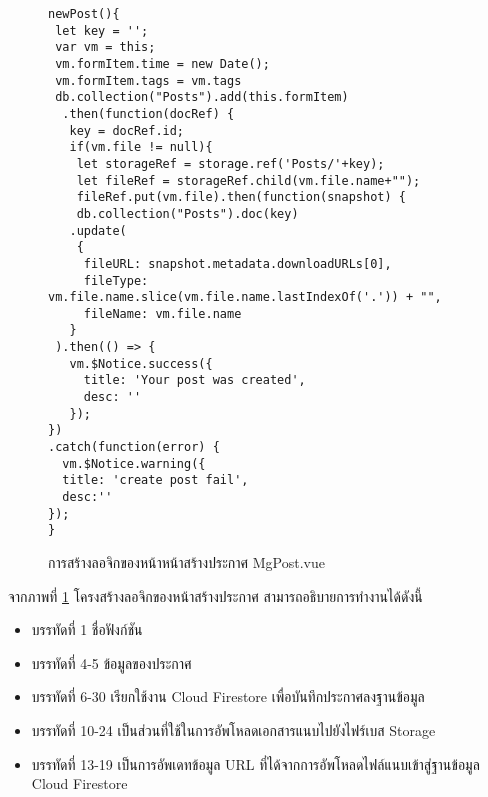 		\begin{figure}[H]
			{\begin{lstlisting}
newPost(){ 
 let key = '';
 var vm = this;
 vm.formItem.time = new Date();
 vm.formItem.tags = vm.tags
 db.collection("Posts").add(this.formItem)
  .then(function(docRef) {
   key = docRef.id;
   if(vm.file != null){
    let storageRef = storage.ref('Posts/'+key);
    let fileRef = storageRef.child(vm.file.name+"");
    fileRef.put(vm.file).then(function(snapshot) {
    db.collection("Posts").doc(key)
   .update(
    {
     fileURL: snapshot.metadata.downloadURLs[0],
     fileType: vm.file.name.slice(vm.file.name.lastIndexOf('.')) + "",
     fileName: vm.file.name
   }
 ).then(() => {
   vm.$Notice.success({
     title: 'Your post was created',
     desc: ''
   });
})
.catch(function(error) {
  vm.$Notice.warning({
  title: 'create post fail',
  desc:''
});
}
				\end{lstlisting}}
			\caption{การสร้างลอจิกของหน้าหน้าสร้างประกาศ MgPost.vue}
			\label{Fig:MgPostJs}
		\end{figure}
		จากภาพที่ \ref{Fig:MgPostJs} โครงสร้างลอจิกของหน้าสร้างประกาศ สามารถอธิบายการทำงานได้ดังนี้
		\begin{itemize}[label={--}]
			\item บรรทัดที่ 1 ชื่อฟังก์ชัน
			\item บรรทัดที่ 4-5 ข้อมูลของประกาศ
			\item บรรทัดที่ 6-30 เรียกใช้งาน Cloud Firestore เพื่อบันทึกประกาศลงฐานข้อมูล
			\item บรรทัดที่ 10-24 เป็นส่วนที่ใช้ในการอัพโหลดเอกสารแนบไปยังไฟร์เบส Storage
			\item บรรทัดที่ 13-19 เป็นการอัพเดทข้อมูล URL ที่ได้จากการอัพโหลดไฟล์แนบเข้าสู่ฐานข้อมูล Cloud Firestore
		\end{itemize}
		
